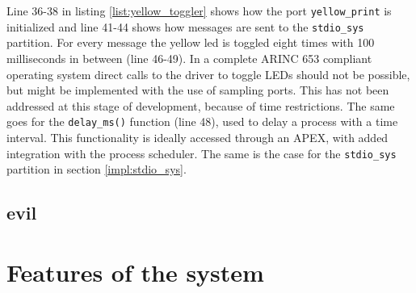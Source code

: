 Line 36-38 in listing \ref{list:yellow_toggler} shows how the port
\texttt{yellow\_print} is initialized and line 41-44 shows how messages are sent
to the \texttt{stdio\_sys} partition. For every message the yellow led is
toggled eight times with 100 milliseconds in between (line 46-49). In a complete
ARINC 653 compliant operating system direct calls to the driver to toggle LEDs
should not be possible, but might be implemented with the use of sampling ports.
This has not been addressed at this stage of development, because of time
restrictions. The same goes for the \texttt{delay\_ms()} function (line 48),
used to delay a process with a time interval. This functionality is ideally
accessed through an APEX, with added integration with the process scheduler.
The same is the case for the \texttt{stdio\_sys} partition in section
\ref{impl:stdio_sys}.

\subsection{evil}


\section{Features of the system}
